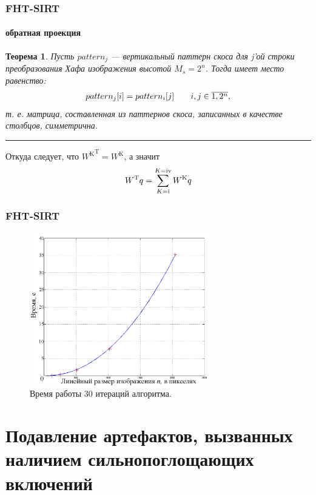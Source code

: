 \documentclass[12pt]{beamer}
\newcommand{\rom}[1]{%
  \textup{\uppercase\expandafter{\romannumeral#1}}%
}
\begin{document}
\begin{frame}
\frametitle{FHT-SIRT}
\framesubtitle{обратная проекция}

\begingroup
\small
\newtheorem{myth}{Теорема}
\begin{myth}
Пусть $pattern_j$ --- вертикальный паттерн скоса для j'ой строки преобразования Хафа изображения высотой $M_s = 2^n$.
Тогда имеет место равенство:
\begin{equation}
\label{statement1}
\begin{array}{l l}
pattern_j[i] = pattern_i[j] & \quad  i,j \in \overline{1, 2^n},
\end{array}
\end{equation}
т. е. матрица, составленная из паттернов скоса, записанных в качестве столбцов, симметрична.
\end{myth}
\endgroup
\noindent\rule{8cm}{0.4pt}
\vspace{0.5cm}

Откуда следует, что ${W^{\mathrm K}} ^ {\mathrm T} = W^{\mathrm K}$, а значит
$$
W^{\mathrm T} q = \sum_{K=\rom{1}}^{K=\rom{4}}{W^{\mathrm K} q}
$$

\end{frame}


\begin{frame}
\frametitle{FHT-SIRT}
\begin{figure}
  \centering
    \includegraphics[width=0.7\textwidth]{part1_img/time_30_it}
  \caption{Время работы 30 итераций алгоритма.}
\end{figure}

\end{frame}

\section{Подавление артефактов, вызванных наличием сильнопоглощающих включений}
\end{document}
